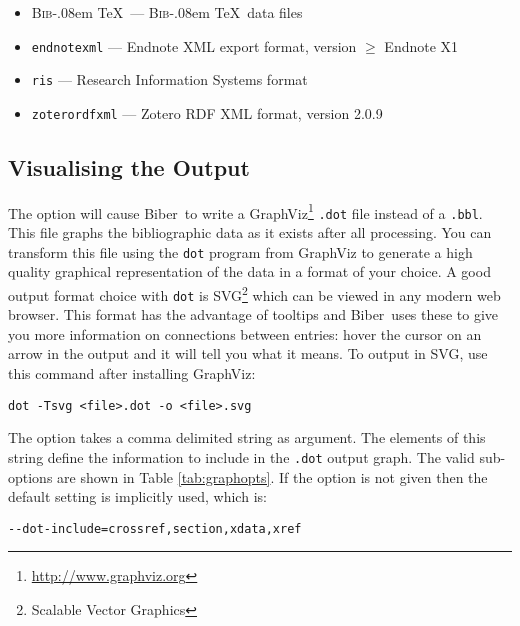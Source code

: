 \documentclass{ltxdockit}
\def\BibTeX{\textsc{Bib}\kern-.08em \TeX}
\newcommand*{\biber}{Biber\xspace}
\begin{document}
\begin{itemize}
\item \BibTeX\ --- \BibTeX\ data files
\item \verb+endnotexml+ --- Endnote XML export format, version $\geq$ Endnote X1
\item \verb+ris+ --- Research Information Systems format
\item \verb+zoterordfxml+ --- Zotero RDF XML format, version 2.0.9
\end{itemize}

\subsection{Visualising the Output}\label{ref:vis}

The option  will cause \biber\ to write a
GraphViz\footnote{\url{http://www.graphviz.org}} \verb+.dot+ file instead
of a \verb+.bbl+. This file graphs the bibliographic data as it exists
after all processing. You can transform this file using the \verb+dot+
program from GraphViz to generate a high quality graphical representation
of the data in a format of your choice. A good output format choice with
\verb+dot+ is SVG\footnote{Scalable Vector Graphics} which can be viewed in
any modern web browser. This format has the advantage of tooltips and \biber\
uses these to give you more information on connections between entries:
hover the cursor on an arrow in the output and it will tell you what it
means. To output in SVG, use this command after installing GraphViz:

\begin{verbatim}
dot -Tsvg <file>.dot -o <file>.svg
\end{verbatim}

\noindent The  option takes a comma delimited string as
argument. The elements of this string define the information to include in
the \verb+.dot+ output graph. The valid sub-options are shown in Table
\ref{tab:graphopts}. If the \opt{--dot-include} option is not given
then the default setting is implicitly used, which is:

\begin{verbatim}
--dot-include=crossref,section,xdata,xref
\end{verbatim}
\end{document}
